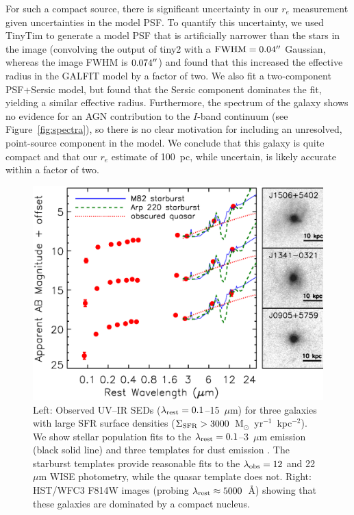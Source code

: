 \documentclass[apj]{emulateapj}
\newcommand{\units}{M$_{\odot}$~yr$^{-1}$~kpc$^{-2}$}
\newcommand{\lrest}{\lambda_{\textnormal{\scriptsize{rest}}}}
\newcommand{\lobs}{\lambda_{\textnormal{\scriptsize{obs}}}}
\newcommand{\sigmasfr}{\Sigma_{\textnormal{\scriptsize{SFR}}}}
\begin{document}
For such a compact source, there is significant uncertainty in our
$r_e$ measurement given uncertainties in the model PSF.  To quantify
this uncertainty, we used TinyTim to generate a model PSF that is
artificially narrower than the stars in the image (convolving the
output of tiny2 with a $\textnormal{FWHM}=0.04\mbox{$^{\prime\prime}$}$ Gaussian,
whereas the image FWHM is $0.074\mbox{$^{\prime\prime}$}$) and found that this
increased the effective radius in the GALFIT model by a factor of two.
We also fit a two-component PSF+Sersic model, but found that the
Sersic component dominates the fit, yielding a similar effective
radius.  Furthermore, the spectrum of the galaxy shows no evidence for
an AGN contribution to the $I$-band continuum (see
Figure~\ref{fig:spectra}), so there is no clear motivation for
including an unresolved, point-source component in the model.  We
conclude that this galaxy is quite compact and that our $r_e$ estimate
of 100~pc, while uncertain, is likely accurate within a factor of two.

\begin{figure}[!t]
\includegraphics[angle=0,scale=0.41]{3seds.ps}
\caption{Left: Observed UV--IR SEDs ($\lrest=0.1$--15~$\mu$m) for
  three galaxies with large SFR surface densities
  ($\sigmasfr>3000$~\units).  We show stellar population fits to the
  $\lrest=0.1$--3~$\mu$m emission (black solid line) and three
  templates for dust emission \citep[M82 starburst, Arp 220 starburst,
    and obscured quasar;][]{pol07}.  The starburst templates provide
  reasonable fits to the $\lobs=12$ and 22~$\mu$m WISE photometry,
  while the quasar template does not.  Right: HST/WFC3 F814W images
  (probing $\lrest\approx5000$~\AA) showing that these galaxies are
  dominated by a compact nucleus.}
\label{fig:seds}
\end{figure}
\end{document}
